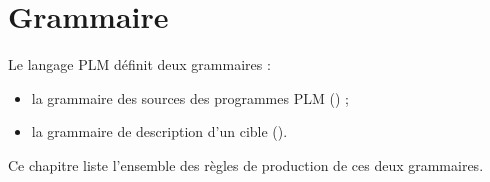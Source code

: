 




\chapter{Grammaire}

Le langage PLM définit deux grammaires :
\begin{itemize}
\item la grammaire des sources des programmes PLM () ;
\item la grammaire de description d'un cible ().
\end{itemize}

Ce chapitre liste l'ensemble des règles de production de ces deux grammaires.


